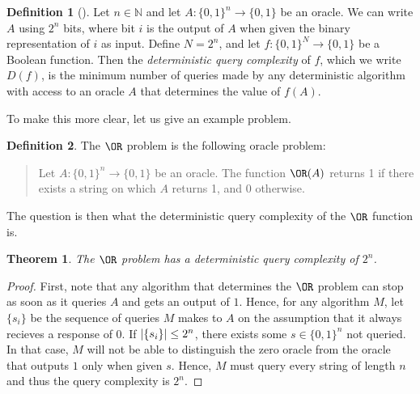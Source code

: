 \documentclass[english,12pt]{reedthesis}
\theoremstyle{plain}
\newtheorem{thm}{Theorem}[section]
\theoremstyle{definition}
\newtheorem{defn}[defn]{Definition}
\theoremstyle{remark}
\DeclarePairedDelimiter{\abs}{\lvert}{\rvert}
\begin{document}
\begin{defn}[{\cite[17]{AW09}}]\label{def:det-qc}
  Let $n \in \mathbb{N}$ and let $A\colon \{0, 1\}^{n} \rightarrow \{0, 1\}$ be an oracle. We can write
  $A$ using $2^{n}$ bits, where bit $i$ is the output of $A$ when given the
  binary representation of $i$ as input. Define $N = 2^{n}$, and let
  $f\colon \{0, 1\}^{N} \rightarrow \{0, 1\}$ be a Boolean function. Then the
  \emph{deterministic query complexity} of $f$, which we write $D(f)$, is the
  minimum number of queries made by any deterministic algorithm with access to
  an oracle $A$ that determines the value of $f(A)$.
\end{defn}

To make this more clear, let us give an example problem.

\begin{defn}\label{def:or-problem}
  The $\OR$ problem is the following oracle problem:
  \begin{quote}
    Let $A\colon \{0, 1\}^{n} \rightarrow \{0, 1\}$ be an oracle. The function $\OR(A)$
    returns 1 if there exists a string on which $A$ returns 1, and $0$
    otherwise.
  \end{quote}
\end{defn}

The question is then what the deterministic query complexity of the $\OR$
function is.

\begin{thm}
  The $\OR$ problem has a deterministic query complexity of $2^{n}$.
\end{thm}

\begin{proof}
  First, note that any algorithm that determines the $\OR$ problem can stop as
  soon as it queries $A$ and gets an output of $1$. Hence, for any algorithm
  $M$, let $\{s_{i}\}$ be the sequence of queries $M$ makes to $A$ on the
  assumption that it always recieves a response of $0$. If
  $\abs{\{s_{i}\}} \le 2^{n}$, there exists some $s \in \{0, 1\}^{n}$ not queried.
  In that case, $M$ will not be able to distinguish the zero oracle from the
  oracle that outputs $1$ only when given $s$. Hence, $M$ must query every
  string of length $n$ and thus the query complexity is $2^{n}$.
\end{proof}
\end{document}
